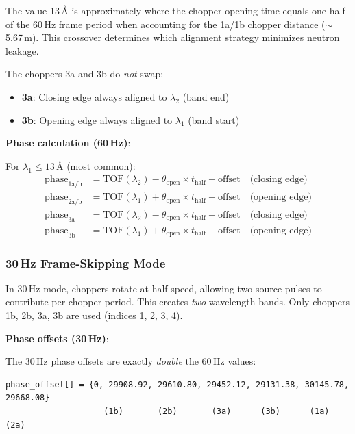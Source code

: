 \documentclass[tm]{ornltm}
\begin{document}
The value 13\,\AA{} is approximately where the chopper opening time equals one half of the 60\,Hz frame period when accounting for the 1a/1b chopper distance ($\sim$5.67\,m). This crossover determines which alignment strategy minimizes neutron leakage.

The choppers 3a and 3b do \emph{not} swap:
\begin{itemize}
    \item \textbf{3a}: Closing edge always aligned to $\lambda_2$ (band end)
    \item \textbf{3b}: Opening edge always aligned to $\lambda_1$ (band start)
\end{itemize}

\textbf{Phase calculation (60\,Hz)}:

For $\lambda_1 \leq 13$\,\AA{} (most common):
\begin{align}
\text{phase}_{1\text{a/b}} &= \text{TOF}(\lambda_2) - \theta_{\text{open}} \times t_{\text{half}} + \text{offset} \quad \text{(closing edge)} \\
\text{phase}_{2\text{a/b}} &= \text{TOF}(\lambda_1) + \theta_{\text{open}} \times t_{\text{half}} + \text{offset} \quad \text{(opening edge)} \\
\text{phase}_{3\text{a}} &= \text{TOF}(\lambda_2) - \theta_{\text{open}} \times t_{\text{half}} + \text{offset} \quad \text{(closing edge)} \\
\text{phase}_{3\text{b}} &= \text{TOF}(\lambda_1) + \theta_{\text{open}} \times t_{\text{half}} + \text{offset} \quad \text{(opening edge)}
\end{align}

\subsubsection{30\,Hz Frame-Skipping Mode}

In 30\,Hz mode, choppers rotate at half speed, allowing two source pulses to contribute per chopper period. This creates \emph{two} wavelength bands. Only choppers 1b, 2b, 3a, 3b are used (indices 1, 2, 3, 4).

\textbf{Phase offsets (30\,Hz)}:

The 30\,Hz phase offsets are exactly \emph{double} the 60\,Hz values:

\begin{verbatim}
phase_offset[] = {0, 29908.92, 29610.80, 29452.12, 29131.38, 30145.78, 29668.08}
                    (1b)       (2b)       (3a)      (3b)      (1a)      (2a)
\end{verbatim}
\end{document}
